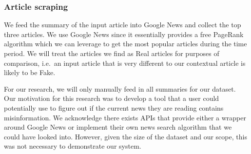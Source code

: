\documentclass{article}
\begin{document}
\subsubsection{Article scraping} \label{section:article-scraping}

We feed the summary of the input article into Google News and collect the top three articles. We use Google News since it essentially provides a free PageRank algorithm which we can leverage to get the most popular articles during the time period. We will treat the articles we find as Real articles for purposes of comparison, i.e.\ an input article that is very different to our contextual article is likely to be Fake.

For our research, we will only manually feed in all summaries for our dataset. Our motivation for this research was to develop a tool that a user could potentially use to figure out if the current news they are reading contains misinformation. We acknowledge there exists APIs that provide either a wrapper around Google News or implement their own news search algorithm that we could have looked into. However, given the size of the dataset and our scope, this was not necessary to demonstrate our system.
\end{document}
